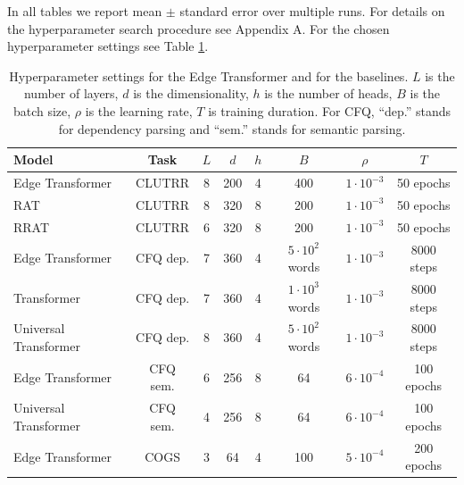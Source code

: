 \documentclass{article}
\begin{document}
In all tables we report mean $\pm$ standard error over multiple runs. For details on the hyperparameter search procedure see Appendix A. For the chosen hyperparameter settings see Table \ref{tbl:hyperparams}.


\begin{table}[]
    \small
    \centering
    \caption{Hyperparameter settings for the Edge Transformer and for
      the baselines. $L$ is the number of layers, $d$ is the dimensionality, $h$ is the number of heads, $B$ is the batch size, $\rho$
      is the learning rate, $T$ is training duration. For CFQ, ``dep.'' stands for dependency parsing and ``sem.'' stands for semantic parsing. }
    \begin{tabular}{lccccccc}
    \toprule
         Model & Task & $L$ & $d$ & $h$ & $B$ & $\rho$ & $T$ \\
    \midrule
         Edge Transformer & CLUTRR & 8 & 200 & 4 & 400 & $1\cdot10^{-3}$ & 50 epochs \\
         RAT & CLUTRR & 8 & 320 & 8 & 200 & $1\cdot10^{-3}$ & 50 epochs \\
         RRAT & CLUTRR & 6 & 320 & 8 & 200 & $1\cdot10^{-3}$ & 50 epochs \\
         Edge Transformer & CFQ dep. & 7 & 360 & 4 & $5 \cdot 10^{2}$ words & $1\cdot10^{-3}$ & 8000 steps \\
         Transformer & CFQ dep. & 7 & 360 & 4 & $1 \cdot 10^{3}$ words & $1\cdot10^{-3}$ & 8000 steps \\
         Universal Transformer & CFQ dep. & 8 & 360 & 4 & $5 \cdot 10^{2}$ words & $1\cdot10^{-3}$ & 8000 steps \\
         Edge Transformer & CFQ sem. & 6 & 256 & 8 & 64 & $6 \cdot 10^{-4}$ & 100 epochs\\
         Universal Transformer & CFQ sem. & 4 & 256 & 8 & 64 &  $6\cdot10^{-4}$ & 100 epochs \\
         Edge Transformer & COGS & 3 & 64 & 4 & 100 &  $5\cdot10^{-4}$ & 200 epochs \\
    \bottomrule
    \end{tabular}
    \label{tbl:hyperparams}
\end{table}
\end{document}
